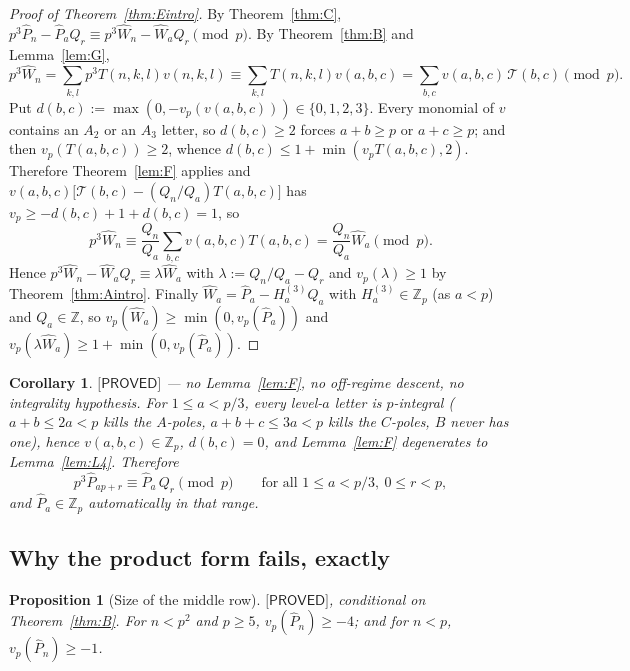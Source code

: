 \documentclass[11pt,reqno]{amsart}
\theoremstyle{plain}
\newtheorem{proposition}[theorem]{Proposition}
\newtheorem{corollary}[theorem]{Corollary}
\theoremstyle{definition}
\theoremstyle{remark}
\numberwithin{equation}{section}
\newcommand{\ZZ}{\mathbb{Z}}
\newcommand{\Zp}{\ZZ_p}
\newcommand{\Tcal}{\mathcal{T}}
\newcommand{\PROVED}{\textsf{[PROVED]}}
\begin{document}
\begin{proof}[Proof of Theorem~\textup{\ref{thm:Eintro}}]
By Theorem~\ref{thm:C}, $p^3\hat P_n-\hat P_aQ_r\equiv p^3\hat W_n-\hat W_aQ_r\pmod p$. By
Theorem~\ref{thm:B} and Lemma~\ref{lem:G},
\[
p^3\hat W_n=\sum_{k,l}p^3T(n,k,l)v(n,k,l)\equiv\sum_{k,l}T(n,k,l)v(a,b,c)
=\sum_{b,c}v(a,b,c)\,\Tcal(b,c)\pmod p .
\]
Put $d(b,c):=\max(0,-v_p(v(a,b,c)))\in\{0,1,2,3\}$. Every monomial of $v$ contains an $A_2$ or
an $A_3$ letter, so $d(b,c)\ge2$ forces $a+b\ge p$ or $a+c\ge p$; and then
$v_p(T(a,b,c))\ge2$, whence $d(b,c)\le1+\min(v_pT(a,b,c),2)$. Therefore Theorem~\ref{lem:F}
applies and $v(a,b,c)\bigl[\Tcal(b,c)-(Q_n/Q_a)T(a,b,c)\bigr]$ has
$v_p\ge-d(b,c)+1+d(b,c)=1$, so
\[
p^3\hat W_n\equiv\frac{Q_n}{Q_a}\sum_{b,c}v(a,b,c)T(a,b,c)=\frac{Q_n}{Q_a}\hat W_a\pmod p .
\]
Hence $p^3\hat W_n-\hat W_aQ_r\equiv\lambda\hat W_a$ with $\lambda:=Q_n/Q_a-Q_r$ and
$v_p(\lambda)\ge1$ by Theorem~\ref{thm:Aintro}. Finally
$\hat W_a=\hat P_a-H^{(3)}_aQ_a$ with $H^{(3)}_a\in\Zp$ (as $a<p$) and $Q_a\in\ZZ$, so
$v_p(\hat W_a)\ge\min(0,v_p(\hat P_a))$ and $v_p(\lambda\hat W_a)\ge1+\min(0,v_p(\hat P_a))$.
\end{proof}

\begin{corollary}\label{cor:Eprime}
$\PROVED$ --- no Lemma~\ref{lem:F}, no off-regime descent, no integrality hypothesis. For
$1\le a<p/3$, every level-$a$ letter is $p$-integral ($a+b\le2a<p$ kills the $A$-poles,
$a+b+c\le3a<p$ kills the $C$-poles, $B$ never has one), hence $v(a,b,c)\in\Zp$,
$d(b,c)=0$, and Lemma~\ref{lem:F} degenerates to Lemma~\ref{lem:L4}. Therefore
\[
p^3\hat P_{ap+r}\equiv\hat P_a\,Q_r\pmod p\qquad\text{for all } 1\le a<p/3,\ 0\le r<p,
\]
and $\hat P_a\in\Zp$ automatically in that range.
\end{corollary}

\subsection{Why the product form fails, exactly}

\begin{proposition}[Size of the middle row]\label{prop:Phatsize}
$\PROVED$, conditional on Theorem~\ref{thm:B}. For $n<p^2$ and $p\ge5$,
$v_p(\hat P_n)\ge-4$; and for $n<p$, $v_p(\hat P_n)\ge-1$.
\end{proposition}
\end{document}

